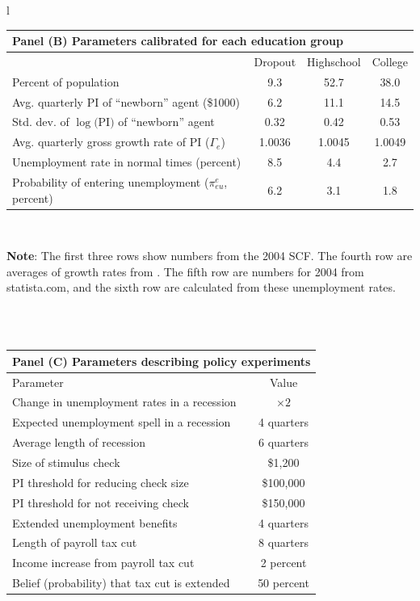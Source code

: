\documentclass[../HAFiscal]{subfiles}
\begin{document}
{\begin{table}[p]
\begin{center}
\begin{tabular}{l}
\begin{tabular}{lccc}
	\toprule 
	\multicolumn{4}{l}{Panel (B) Parameters calibrated for each education group} \\ \midrule
	& Dropout & Highschool & College \\ \midrule
	Percent of population & \phantom{0}9.3 & 52.7 & 38.0 \\ 
	Avg. quarterly PI of ``newborn'' agent (\$1000) & \phantom{0}6.2 & 11.1 & 14.5 \\
	Std. dev. of $\log($PI$)$ of ``newborn'' agent & 0.32 & 0.42 & 0.53 \\
	Avg. quarterly gross growth rate of PI ($\Gamma_e$) & 1.0036 & 1.0045 & 1.0049 \\
	Unemployment rate in normal times (percent) & \phantom{0}8.5 & \phantom{0}4.4 & \phantom{0}2.7 \\ 
	Probability of entering unemployment ($\pi_{eu}^{e}$, percent) & \phantom{0}6.2 & \phantom{0}3.1 & \phantom{0}1.8 
	\\ \bottomrule 
\end{tabular} \\
\parbox{16cm}{\small \vspace{.25cm} \textbf{Note}: The first three rows show numbers from the 2004 SCF. The fourth row are averages of growth rates from \cite{carroll2020modeling}. The fifth row are numbers for 2004 from statista.com, and the sixth row are calculated from these unemployment rates.\normalsize}
\\ \\

\begin{tabular}{lc}
	\toprule 
	\multicolumn{2}{l}{Panel (C) Parameters describing policy experiments} \\ \midrule 
	Parameter & Value \\ \midrule 
	Change in unemployment rates in a recession & $\times 2$ \\ 
	Expected unemployment spell in a recession & 4 quarters \\ 
	Average length of recession & 6 quarters \\ 
	Size of stimulus check & \$1,200 \\ 
	PI threshold for reducing check size & \$100,000 \\ 
	PI threshold for not receiving check & \$150,000 \\ 
	Extended unemployment benefits & 4 quarters \\
	Length of payroll tax cut & 8 quarters \\ 
	Income increase from payroll tax cut & 2 percent \\ 
	Belief (probability) that tax cut is extended & 50 percent 		
	\\ \bottomrule
\end{tabular} 


\end{tabular}
\end{center}
\end{table}}
\end{document}
